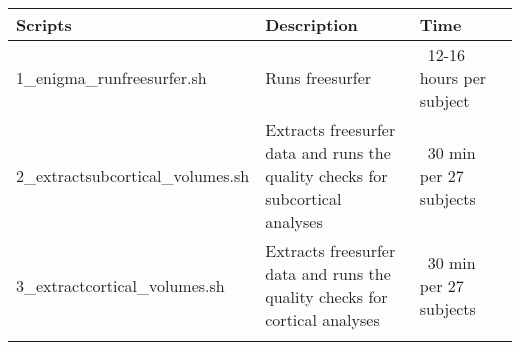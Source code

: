 \documentclass[twocolumn]{bmcart}%
\begin{document}
\begin{frontmatter}
\begin{fmbox}
\begin{artnotes}
\end{artnotes}




	








%
\end{fmbox}%

\end{frontmatter}


\begin{table*}
\begin{tabular*}{\textwidth}{p{3cm}p{2cm}p{4cm}p{6cm}}
  Scripts  & Description  &  Time \\
    \hline\noalign{\smallskip}
  1_enigma_runfreesurfer.sh     &    Runs freesurfer      &    ~12-16 hours per subject    \\
  2_extractsubcortical_volumes.sh     &    Extracts freesurfer data and runs the quality checks for subcortical analyses      &    ~30 min per 27 subjects   \\
  3_extractcortical_volumes.sh     &    Extracts freesurfer data and runs the quality checks for cortical analyses     &     ~30 min per 27 subjects   \\
 
    \noalign{\smallskip}\hline
\end{tabular*}
\end{table*}
\end{document}
